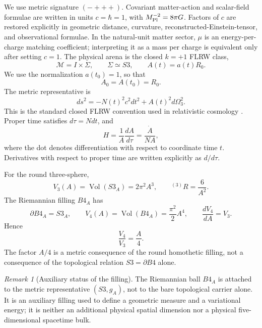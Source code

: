 \documentclass[11pt,a4paper]{article}
\def\Bfour{B4}%
\def\Sthree{S3}%
\def\dd{d}%
\numberwithin{equation}{section}
\theoremstyle{definition}
\theoremstyle{plain}
\theoremstyle{remark}
\newtheorem{remark}[criterion]{Remark}
\newcommand{\Sthree}{S^3}
\newcommand{\Bfour}{B^4}
\newcommand{\M}{\mathcal{M}}
\newcommand{\vol}{\operatorname{Vol}}
\newcommand{\dd}{\mathrm{d}}
\begin{document}
We use metric signature \((-+++)\). Covariant matter-action and scalar-field formulae are written in units \(c=\hbar=1\), with \(M_{\rm Pl}^{-2}=8\pi G\). Factors of \(c\) are restored explicitly in geometric distance, curvature, reconstructed-Einstein-tensor, and observational formulae. In the natural-unit matter sector, \(\mu\) is an energy-per-charge matching coefficient; interpreting it as a mass per charge is equivalent only after setting \(c=1\). The physical arena is the closed \(k=+1\) FLRW class,
\begin{equation}
\M=I\times \Sigma,
\qquad
\Sigma\simeq \Sthree,
\qquad
A(t)=a(t)R_0.
\end{equation}
We use the normalization \(a(t_0)=1\), so that
\begin{equation}
A_0=A(t_0)=R_0.
\end{equation}
The metric representative is
\begin{equation}
\dd s^2=-N(t)^2c^2\dd t^2+A(t)^2\dd\Omega_3^2.
\end{equation}
This is the standard closed FLRW convention used in relativistic cosmology \cite{HawkingEllis1973,MTW1973,Weinberg2008}.
Proper time satisfies \(\dd\tau=N\dd t\), and
\begin{equation}
H=\frac{1}{A}\frac{\dd A}{\dd\tau}=\frac{\dot A}{NA},
\end{equation}
where the dot denotes differentiation with respect to coordinate time \(t\). Derivatives with respect to proper time are written explicitly as \(\dd/\dd\tau\).

For the round three-sphere,
\begin{equation}
V_3(A)=\vol(\Sthree_A)=2\pi^2A^3,
\qquad
{}^{(3)}R=\frac{6}{A^2}.
\end{equation}
The Riemannian filling \(\Bfour_A\) has
\begin{equation}
\partial \Bfour_A=\Sthree_A,
\qquad
V_4(A)=\vol(\Bfour_A)=\frac{\pi^2}{2}A^4,
\qquad
\frac{\dd V_4}{\dd A}=V_3.
\end{equation}
Hence
\begin{equation}
\frac{V_4}{V_3}=\frac{A}{4}.
\end{equation}
The factor \(A/4\) is a metric consequence of the round homothetic filling, not a consequence of the topological relation \(\Sthree=\partial\Bfour\) alone.

\begin{remark}[Auxiliary status of the filling]
The Riemannian ball \(\Bfour_A\) is attached to the metric representative \((\Sthree,g_A)\), not to the bare topological carrier alone. It is an auxiliary filling used to define a geometric measure and a variational energy; it is neither an additional physical spatial dimension nor a physical five-dimensional spacetime bulk.
\end{remark}
\end{document}
